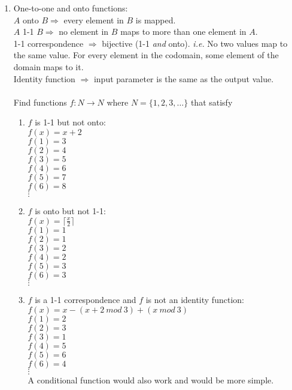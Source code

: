 \documentclass[10pt,a4paper,final]{article}
\begin{document}
\begin{enumerate}
\item %
One-to-one and onto functions:\\
$A$ onto $B \Rightarrow$ every element in $B$ is mapped.\\
$A$ 1-1 $B \Rightarrow$ no element in $B$ maps to more than one element in $A$.\\
1-1 correspondence $\Rightarrow$ bijective (1-1 \emph{and} onto).
\emph{i.e.} No two values map to the same value.
For every element in the codomain, some element of the domain maps to it.\\
Identity function $\Rightarrow$ input parameter is the same as the output value.\\
\\
Find functions $f:N \rightarrow N$ where $N = \{1,2,3,\dots\}$ that satisfy
\begin{enumerate}
  \item $f$ is 1-1 but not onto:\\
  $f(x) = x + 2$\\
  $f(1) = 3$\\
  $f(2) = 4$\\
  $f(3) = 5$\\
  $f(4) = 6$\\
  $f(5) = 7$\\
  $f(6) = 8$\\
  $\vdots$\\
  \item $f$ is onto but not 1-1:\\
  $f(x) = \lceil \frac{x}{2} \rceil$\\
  $f(1) = 1$\\
  $f(2) = 1$\\
  $f(3) = 2$\\
  $f(4) = 2$\\
  $f(5) = 3$\\
  $f(6) = 3$\\
  $\vdots$\\
  \item $f$ is a 1-1 correspondence and $f$ is not an identity function:\\
  $f(x) = x - (x + 2 \: mod \: 3) + (x \: mod \: 3)$\\
  $f(1) = 2$\\
  $f(2) = 3$\\
  $f(3) = 1$\\
  $f(4) = 5$\\
  $f(5) = 6$\\
  $f(6) = 4$\\
  $\vdots$\\
  A conditional function would also work and would be more simple.
\end{enumerate}


\end{enumerate}
\end{document}
